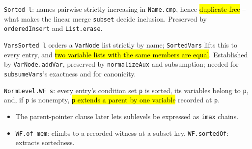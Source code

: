 \begin{definition}
\label{def:lvl-sorted}
\leanok
{}
 \texttt{Sorted l}: names pairwise strictly increasing in \texttt{Name.cmp}, hence
\hl{duplicate-free} -- what makes the linear merge \texttt{subset} decide inclusion. Preserved by
\texttt{orderedInsert} and \texttt{List.erase}.
\end{definition}

\begin{definition}
\label{def:lvl-varssorted}
\leanok
{}
 \texttt{VarsSorted l} orders a \texttt{VarNode} list strictly by name;
\texttt{SortedVars} lifts this to every entry, and \hl{two variable lists with the same members are
equal}. Established by \texttt{VarNode.addVar}, preserved by \texttt{normalizeAux} and subsumption;
needed for \texttt{subsumeVars}'s exactness and for canonicity.
\end{definition}

\begin{definition}
\label{def:lvl-normlevel-wf}
\leanok
{}
 \texttt{NormLevel.WF s}: every entry's condition set \texttt{p} is sorted, its
variables belong to \texttt{p}, and, if \texttt{p} is nonempty, \hl{\texttt{p} extends a parent by one
variable} recorded at \texttt{p}.
\begin{itemize}
\item The parent-pointer clause later lets sublevels be expressed as \texttt{imax} chains.
\item \texttt{WF.of\_mem}: climbs to a recorded witness at a subset key. \texttt{WF.sortedOf}: extracts
sortedness.
\end{itemize}
\end{definition}

